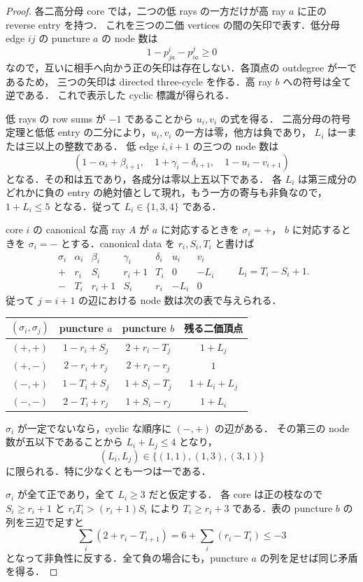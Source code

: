 \begin{proof}
各二高分母 core では，二つの低 rays の一方だけが高 ray $a$ に正の reverse entry を持つ．
これを三つの二価 vertices の間の矢印で表す．低分母 edge $ij$ の puncture $a$ の node 数は
\[
 1-p^i_{ja}-p^j_{ia}\geq0
\]
なので，互いに相手へ向かう正の矢印は存在しない．各頂点の outdegree が一であるため，
三つの矢印は directed three-cycle を作る．高 ray $b$ への符号は全て逆である．
これで表示した cyclic 標識が得られる．

低 rays の row sums が $-1$ であることから $u_i,v_i$ の式を得る．
二高分母の符号定理と低低 entry の二分により，$u_i,v_i$ の一方は零，他方は負であり，
$L_i$ は一または三以上の整数である．
低 edge $i,i+1$ の三つの node 数は
\begin{equation}\label{kn14:three-nodes}
 \left(1-\alpha_i+\beta_{i+1},\quad
       1+\gamma_i-\delta_{i+1},\quad
       1-u_i-v_{i+1}\right)
\end{equation}
となる．その和は五であり，各成分は零以上五以下である．
各 $L_i$ は第三成分のどれかに負の entry の絶対値として現れ，もう一方の寄与も非負なので，
$1+L_i\leq5$ となる．従って $L_i\in\{1,3,4\}$ である．

core $i$ の canonical な高 ray $A$ が $a$ に対応するときを $\sigma_i=+$，
$b$ に対応するときを $\sigma_i=-$ とする．canonical data を $r_i,S_i,T_i$ と書けば
\[
\begin{array}{c|rrrr|rr}
\sigma_i&\alpha_i&\beta_i&\gamma_i&\delta_i&u_i&v_i\\\hline
 +&r_i&S_i&r_i+1&T_i&0&-L_i\\
 -&T_i&r_i+1&S_i&r_i&-L_i&0
\end{array}
\qquad L_i=T_i-S_i+1.
\]
従って $j=i+1$ の辺における node 数は次の表で与えられる．
\begin{center}
\small
\begin{tabular}{c|ccc}
 $(\sigma_i,\sigma_j)$&puncture $a$&puncture $b$&残る二価頂点\\\hline
 $(+,+)$&$1-r_i+S_j$&$2+r_i-T_j$&$1+L_j$\\
 $(+,-)$&$2-r_i+r_j$&$2+r_i-r_j$&$1$\\
 $(-,+)$&$1-T_i+S_j$&$1+S_i-T_j$&$1+L_i+L_j$\\
 $(-,-)$&$2-T_i+r_j$&$1+S_i-r_j$&$1+L_i$
\end{tabular}
\end{center}

$\sigma_i$ が一定でないなら，cyclic な順序に $(-,+)$ の辺がある．
その第三の node 数が五以下であることから $L_i+L_j\leq4$ となり，
\[
 (L_i,L_j)\in\{(1,1),(1,3),(3,1)\}
\]
に限られる．特に少なくとも一つは一である．

$\sigma_i$ が全て正であり，全て $L_i\geq3$ だと仮定する．
各 core は正の枝なので $S_i\geq r_i+1$ と $r_iT_i>(r_i+1)S_i$ により
$T_i\geq r_i+3$ である．表の puncture $b$ の列を三辺で足すと
\[
 \sum_i(2+r_i-T_{i+1})
 =6+\sum_i(r_i-T_i)\leq-3
\]
となって非負性に反する．全て負の場合にも，puncture $a$ の列を足せば同じ矛盾を得る．
\end{proof}


